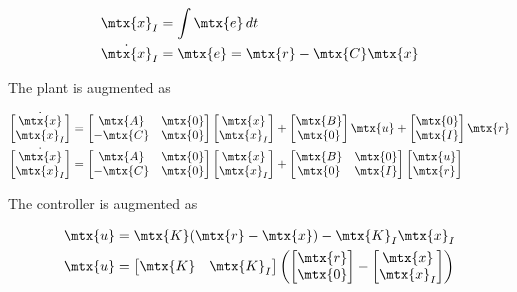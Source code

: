 \begin{align*}
  \mtx{x}_I &= \int \mtx{e} \,dt \\
  \dot{\mtx{x}}_I &= \mtx{e} = \mtx{r} - \mtx{C}\mtx{x}
\end{align*}

The \gls{plant} is augmented as

\begin{align*}
  \dot{\begin{bmatrix}
    \mtx{x} \\
    \mtx{x}_I
  \end{bmatrix}} &=
  \begin{bmatrix}
    \mtx{A} & \mtx{0} \\
    -\mtx{C} & \mtx{0}
  \end{bmatrix}
  \begin{bmatrix}
    \mtx{x} \\
    \mtx{x}_I
  \end{bmatrix} +
  \begin{bmatrix}
    \mtx{B} \\
    \mtx{0}
  \end{bmatrix}
  \mtx{u} +
  \begin{bmatrix}
    \mtx{0} \\
    \mtx{I}
  \end{bmatrix}
  \mtx{r} \\
  \dot{\begin{bmatrix}
    \mtx{x} \\
    \mtx{x}_I
  \end{bmatrix}} &=
  \begin{bmatrix}
    \mtx{A} & \mtx{0} \\
    -\mtx{C} & \mtx{0}
  \end{bmatrix}
  \begin{bmatrix}
    \mtx{x} \\
    \mtx{x}_I
  \end{bmatrix} +
  \begin{bmatrix}
    \mtx{B} & \mtx{0} \\
    \mtx{0} & \mtx{I}
  \end{bmatrix}
  \begin{bmatrix}
    \mtx{u} \\
    \mtx{r}
  \end{bmatrix}
\end{align*}

The controller is augmented as

\begin{align*}
  \mtx{u} &= \mtx{K} (\mtx{r} - \mtx{x}) - \mtx{K}_I\mtx{x}_I \\
  \mtx{u} &=
  \begin{bmatrix}
    \mtx{K} & \mtx{K}_I
  \end{bmatrix}
  \left(\begin{bmatrix}
    \mtx{r} \\
    \mtx{0}
  \end{bmatrix} -
  \begin{bmatrix}
    \mtx{x} \\
    \mtx{x}_I
  \end{bmatrix}\right)
\end{align*}

